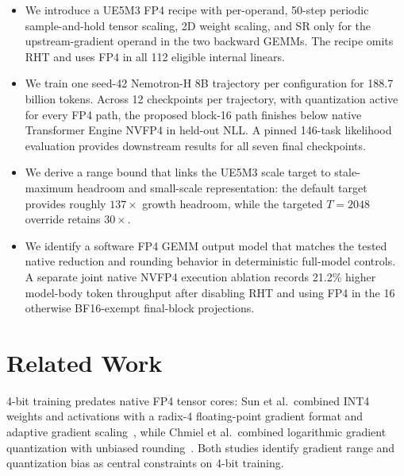 \documentclass[11pt]{article}
\newcommand{\ue}{UE5M3}
\newcommand{\uefp}{UE5M3 FP4}
\newcommand{\nv}{NVFP4}
\begin{document}
\begin{itemize}
  \item We introduce a \uefp{} recipe with per-operand, 50-step periodic
        sample-and-hold tensor scaling, 2D weight scaling, and SR only for the
        upstream-gradient operand in the two backward GEMMs.  The recipe omits
        RHT and uses FP4 in all 112 eligible internal linears.
  \item We train one seed-42 Nemotron-H 8B trajectory per configuration for
        188.7 billion tokens.  Across 12 checkpoints per trajectory, with
        quantization active for every FP4 path, the proposed block-16 path
        finishes below native Transformer Engine \nv{} in held-out NLL.  A
        pinned 146-task likelihood evaluation provides downstream results for
        all seven final checkpoints.
  \item We derive a range bound that links the \ue{} scale target to stale-maximum
        headroom and small-scale representation: the default target provides
        roughly $137\times$ growth headroom, while the targeted $T=2048$
        override retains $30\times$.
  \item We identify a software FP4 GEMM output model that matches the tested
        native reduction and rounding behavior in deterministic full-model
        controls.  A separate joint native \nv{} execution ablation records
        21.2\% higher model-body token throughput after disabling RHT and using
        FP4 in the 16 otherwise BF16-exempt final-block projections.
\end{itemize}

\section{Related Work}
\label{sec:related-work}

4-bit training predates native FP4 tensor cores: Sun et al.\ combined INT4
weights and activations with a radix-4 floating-point gradient format and
adaptive gradient scaling~\citep{sun2020ultralow}, while Chmiel et al.\
combined logarithmic gradient quantization with unbiased
rounding~\citep{chmiel2023accurate}.  Both studies identify gradient
range and quantization bias as central constraints on 4-bit training.
\end{document}
